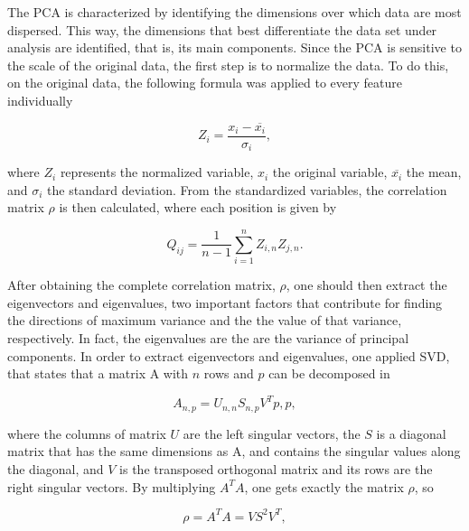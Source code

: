 The \ac{PCA} is characterized by identifying the dimensions over which data are most dispersed. This way, the dimensions that best differentiate the data set under analysis are identified, that is, its main components. Since the \ac{PCA} is sensitive to the scale of the original data, the first step is to normalize the data. To do this, on the original data, the following formula was applied to every feature individually

\begin{equation}
   Z_i = \frac{x_i-\overline{x_i}}{\sigma_i},
   \label{PCA1}
\end{equation}

where $Z_i$ represents the normalized variable, $x_i$ the original variable, $\overline{x_i}$ the mean, and $\sigma_i$ the standard deviation. From the standardized variables, the correlation matrix $\rho$ is then calculated, where each position is given by


\begin{equation}
   Q_{ij} = \frac{1}{n-1}\sum_{i=1}^nZ_{i,n}Z_{j,n}.
   \label{PCA2}
\end{equation}

After obtaining the complete correlation matrix, $\rho$, one should then extract the eigenvectors and eigenvalues, two important factors that contribute for finding the directions of maximum variance and the the value of that variance, respectively. In fact, the eigenvalues are the are  the  variance  of  principal  components. In order to extract eigenvectors and eigenvalues, one applied \ac{SVD}, that states that a matrix A with $n$ rows and $p$ can be decomposed in 

\begin{equation}
   A_{n,p} = U_{n,n} S_{n,p} V^T{p,p},
   \label{PCA3}
\end{equation}

where the columns of matrix $U$ are the left singular vectors, the $S$ is a diagonal matrix that has the same dimensions as A, and contains the singular values along the diagonal, and $V$ is the transposed orthogonal matrix and its rows are the right singular vectors. By multiplying $A^TA$, one gets exactly the matrix $\rho$, so 

\begin{equation}
   \rho = A^TA = VS^2V^T,
   \label{PCA4}
\end{equation}

